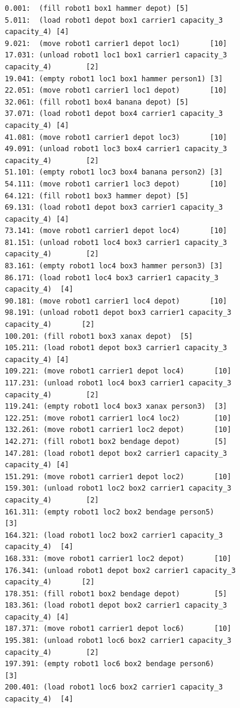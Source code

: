 \begin{figure}[h!]
    \small
    \begin{verbatim}
0.001:  (fill robot1 box1 hammer depot) [5]
5.011:  (load robot1 depot box1 carrier1 capacity_3 capacity_4) [4]
9.021:  (move robot1 carrier1 depot loc1)       [10]
17.031: (unload robot1 loc1 box1 carrier1 capacity_3 capacity_4)        [2]
19.041: (empty robot1 loc1 box1 hammer person1) [3]
22.051: (move robot1 carrier1 loc1 depot)       [10]
32.061: (fill robot1 box4 banana depot) [5]
37.071: (load robot1 depot box4 carrier1 capacity_3 capacity_4) [4]
41.081: (move robot1 carrier1 depot loc3)       [10]
49.091: (unload robot1 loc3 box4 carrier1 capacity_3 capacity_4)        [2]
51.101: (empty robot1 loc3 box4 banana person2) [3]
54.111: (move robot1 carrier1 loc3 depot)       [10]
64.121: (fill robot1 box3 hammer depot) [5]
69.131: (load robot1 depot box3 carrier1 capacity_3 capacity_4) [4]
73.141: (move robot1 carrier1 depot loc4)       [10]
81.151: (unload robot1 loc4 box3 carrier1 capacity_3 capacity_4)        [2]
83.161: (empty robot1 loc4 box3 hammer person3) [3]
86.171: (load robot1 loc4 box3 carrier1 capacity_3 capacity_4)  [4]
90.181: (move robot1 carrier1 loc4 depot)       [10]
98.191: (unload robot1 depot box3 carrier1 capacity_3 capacity_4)       [2]
100.201: (fill robot1 box3 xanax depot)  [5]
105.211: (load robot1 depot box3 carrier1 capacity_3 capacity_4) [4]
109.221: (move robot1 carrier1 depot loc4)       [10]
117.231: (unload robot1 loc4 box3 carrier1 capacity_3 capacity_4)        [2]
119.241: (empty robot1 loc4 box3 xanax person3)  [3]
122.251: (move robot1 carrier1 loc4 loc2)        [10]
132.261: (move robot1 carrier1 loc2 depot)       [10]
142.271: (fill robot1 box2 bendage depot)        [5]
147.281: (load robot1 depot box2 carrier1 capacity_3 capacity_4) [4]
151.291: (move robot1 carrier1 depot loc2)       [10]
159.301: (unload robot1 loc2 box2 carrier1 capacity_3 capacity_4)        [2]
161.311: (empty robot1 loc2 box2 bendage person5)        [3]
164.321: (load robot1 loc2 box2 carrier1 capacity_3 capacity_4)  [4]
168.331: (move robot1 carrier1 loc2 depot)       [10]
176.341: (unload robot1 depot box2 carrier1 capacity_3 capacity_4)       [2]
178.351: (fill robot1 box2 bendage depot)        [5]
183.361: (load robot1 depot box2 carrier1 capacity_3 capacity_4) [4]
187.371: (move robot1 carrier1 depot loc6)       [10]
195.381: (unload robot1 loc6 box2 carrier1 capacity_3 capacity_4)        [2]
197.391: (empty robot1 loc6 box2 bendage person6)        [3]
200.401: (load robot1 loc6 box2 carrier1 capacity_3 capacity_4)  [4]

\end{verbatim}
\end{figure}
